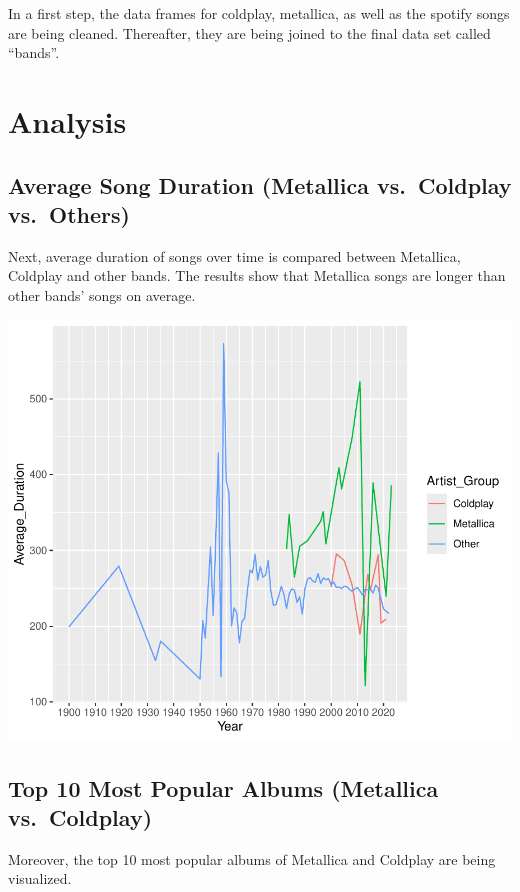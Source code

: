 \documentclass[11pt,preprint]{elsarticle}
\numberwithin{equation}{section}
\numberwithin{figure}{section}
\numberwithin{table}{section}
\begin{document}
In a first step, the data frames for coldplay, metallica, as well as the
spotify songs are being cleaned. Thereafter, they are being joined to
the final data set called ``bands''.

\section{Analysis}\label{analysis}

\subsection{Average Song Duration (Metallica vs.~Coldplay
vs.~Others)}\label{average-song-duration-metallica-vs.-coldplay-vs.-others}

Next, average duration of songs over time is compared between Metallica,
Coldplay and other bands. The results show that Metallica songs are
longer than other bands' songs on average.

\includegraphics{Task_2_files/figure-latex/unnamed-chunk-4-1.pdf}

\subsection{Top 10 Most Popular Albums (Metallica
vs.~Coldplay)}\label{top-10-most-popular-albums-metallica-vs.-coldplay}

Moreover, the top 10 most popular albums of Metallica and Coldplay are
being visualized.
\end{document}
